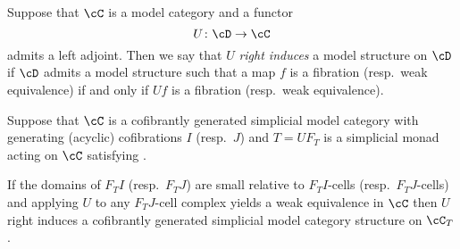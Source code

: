 \documentclass[leqno,oneside,english]{elsarticle}
\begin{document}
Suppose that $\cC$ is a model category and a functor 
\[
U\colon \cD\rightarrow \cC 
\] 
admits a left adjoint. Then we say that $U$ \emph{right induces} a
model structure on $\cD$ if $\cD$ admits a model structure such that a
map $f$ is a fibration (resp.~weak equivalence) if and only if $Uf$ is
a fibration (resp.~weak equivalence).

\begin{thm}\label{prop:model-cat-algebras}
  Suppose that $\cC$ is a cofibrantly generated simplicial model
  category with generating (acyclic) cofibrations $I$ (resp.~$J$) and
  $T= U F_T$ is a simplicial monad acting on $\cC$ satisfying
  .
  
  If the domains of $F_T I$ (resp.~$F_T J$) are small relative to $F_T
  I$-cells (resp.~$F_T J$-cells) and applying $U$ to any $F_T J$-cell
  complex yields a weak equivalence in $\cC$ then $U$ right induces a
  cofibrantly generated simplicial model category structure  on $\cC_T$.
\end{thm}
\end{document}
